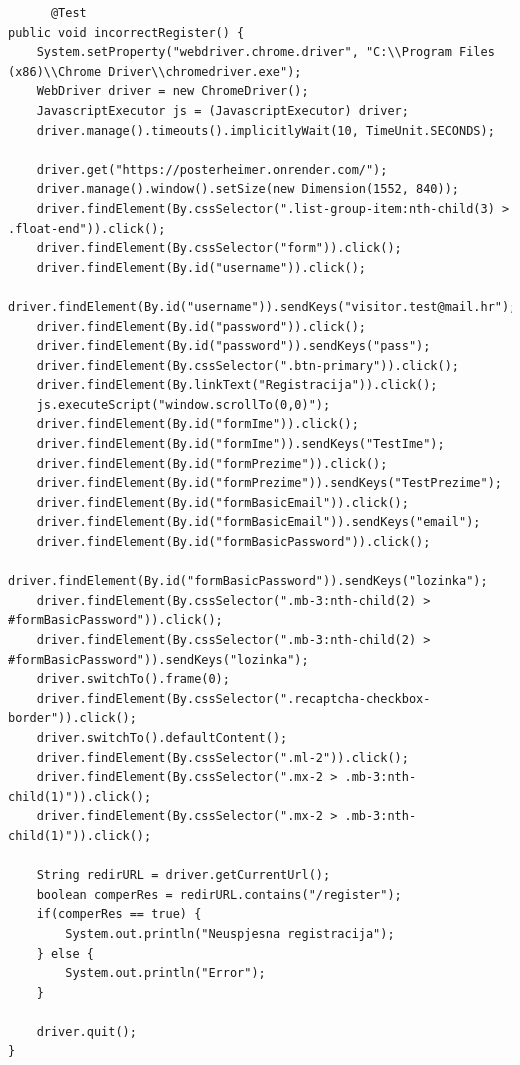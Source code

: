 			\begin{lstlisting}
	  @Test
public void incorrectRegister() {
	System.setProperty("webdriver.chrome.driver", "C:\\Program Files (x86)\\Chrome Driver\\chromedriver.exe");
	WebDriver driver = new ChromeDriver();
	JavascriptExecutor js = (JavascriptExecutor) driver;
	driver.manage().timeouts().implicitlyWait(10, TimeUnit.SECONDS);
	
	driver.get("https://posterheimer.onrender.com/");
	driver.manage().window().setSize(new Dimension(1552, 840));
	driver.findElement(By.cssSelector(".list-group-item:nth-child(3) > .float-end")).click();
	driver.findElement(By.cssSelector("form")).click();
	driver.findElement(By.id("username")).click();
	driver.findElement(By.id("username")).sendKeys("visitor.test@mail.hr");
	driver.findElement(By.id("password")).click();
	driver.findElement(By.id("password")).sendKeys("pass");
	driver.findElement(By.cssSelector(".btn-primary")).click();
	driver.findElement(By.linkText("Registracija")).click();
	js.executeScript("window.scrollTo(0,0)");
	driver.findElement(By.id("formIme")).click();
	driver.findElement(By.id("formIme")).sendKeys("TestIme");
	driver.findElement(By.id("formPrezime")).click();
	driver.findElement(By.id("formPrezime")).sendKeys("TestPrezime");
	driver.findElement(By.id("formBasicEmail")).click();
	driver.findElement(By.id("formBasicEmail")).sendKeys("email");
	driver.findElement(By.id("formBasicPassword")).click();
	driver.findElement(By.id("formBasicPassword")).sendKeys("lozinka");
	driver.findElement(By.cssSelector(".mb-3:nth-child(2) > #formBasicPassword")).click();
	driver.findElement(By.cssSelector(".mb-3:nth-child(2) > #formBasicPassword")).sendKeys("lozinka");
	driver.switchTo().frame(0);
	driver.findElement(By.cssSelector(".recaptcha-checkbox-border")).click();
	driver.switchTo().defaultContent();
	driver.findElement(By.cssSelector(".ml-2")).click();
	driver.findElement(By.cssSelector(".mx-2 > .mb-3:nth-child(1)")).click();
	driver.findElement(By.cssSelector(".mx-2 > .mb-3:nth-child(1)")).click();
	
	String redirURL = driver.getCurrentUrl();
	boolean comperRes = redirURL.contains("/register");
	if(comperRes == true) {
		System.out.println("Neuspjesna registracija");
	} else {
		System.out.println("Error");
	}
	
	driver.quit();
}	  
			\end{lstlisting}
			
